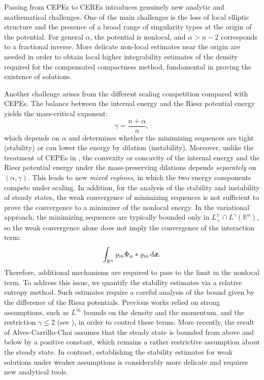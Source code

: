 \documentclass[reqno,11pt]{amsart}
\numberwithin{equation}{section}
\theoremstyle{definition}
\def\dd{{\, \rm d}}
\begin{document}
\smallskip
Passing from CEPEs to CEREs introduces genuinely new analytic and mathematical challenges. One of the main challenges is the loss of local elliptic structure and the presence of a broad range of singularity types 
at the origin of the potential.
For general $\alpha$, the potential is nonlocal, and $\alpha>n-2$ corresponds to a fractional inverse. 
More delicate non-local estimates near the origin are needed in order 
to obtain local higher integrability estimates of the density required for the compensated 
compactness method, fundamental in proving the existence of solutions. 

\smallskip
Another challenge arises from the different scaling competition compared with CEPEs.
The balance between the internal energy and the Riesz potential energy 
yields the mass-critical exponent:
$$
\gamma=\frac{n+\alpha}{n},
$$
which depends on $\alpha$ and determines whether the minimizing sequences are tight (stability) 
or can lower the energy by dilation (instability).
Moreover, unlike the treatment of CEPEs in \cite{Cheng_2025}, 
the convexity or concavity of the internal energy and the Riesz potential 
energy under the mass-preserving dilations depends {\it separately} on $(\alpha,\gamma)$. 
This leads to new {\it mixed regimes}, in which the two energy components compete under scaling. 
In addition, for the analysis of the stability and instability of steady states, 
the weak convergence of minimizing sequences is not sufficient to 
prove the convergence to a minimizer of the nonlocal energy. 
In the variational approach, the minimizing sequences are typically bounded only 
in $L^1_+\cap L^\gamma (\mathbb{R}^n)$, so the weak convergence alone does not  
imply the convergence of the interaction term:
$$
\int_{\mathbb{R}^n} \varrho_m\Phi_\alpha*\varrho_m \dd \boldsymbol{x}.
$$ 
Therefore, additional mechanisms are required to pass to the limit 
in the nonlocal term. 
To address this issue, we quantify the stability estimates via a relative entropy method. 
Such estimates require a careful analysis of the bound given by the difference 
of the Riesz potentials. 
Previous works relied on strong assumptions, such as $L^\infty$ bounds 
on the density and the momentum, 
and the restriction $\gamma \leq 2$ (see \cite{Luo_2008}), in order to control these terms. 
More recently, the result of Alves-Carrillo-Choi \cite{Alves_2024} assumes that 
the steady state is bounded from above and below by a positive constant, 
which remains a rather restrictive assumption about the steady state. 
In contrast, establishing the stability estimates for weak solutions under weaker assumptions
is considerably more delicate and requires new analytical tools.
\end{document}
